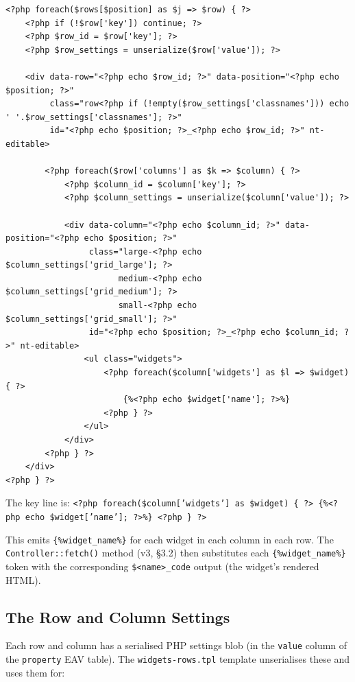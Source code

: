 \documentclass[11pt,a4paper]{article}
\begin{document}
\begin{lstlisting}[caption={\texttt{shared/widgets-rows.tpl} --- the placeholder emitter.},label={lst:widgets-rows}]
<?php foreach($rows[$position] as $j => $row) { ?>
    <?php if (!$row['key']) continue; ?>
    <?php $row_id = $row['key']; ?>
    <?php $row_settings = unserialize($row['value']); ?>

    <div data-row="<?php echo $row_id; ?>" data-position="<?php echo $position; ?>"
         class="row<?php if (!empty($row_settings['classnames'])) echo ' '.$row_settings['classnames']; ?>"
         id="<?php echo $position; ?>_<?php echo $row_id; ?>" nt-editable>

        <?php foreach($row['columns'] as $k => $column) { ?>
            <?php $column_id = $column['key']; ?>
            <?php $column_settings = unserialize($column['value']); ?>

            <div data-column="<?php echo $column_id; ?>" data-position="<?php echo $position; ?>"
                 class="large-<?php echo $column_settings['grid_large']; ?>
                       medium-<?php echo $column_settings['grid_medium']; ?>
                       small-<?php echo $column_settings['grid_small']; ?>"
                 id="<?php echo $position; ?>_<?php echo $column_id; ?>" nt-editable>
                <ul class="widgets">
                    <?php foreach($column['widgets'] as $l => $widget) { ?>
                        {%<?php echo $widget['name']; ?>%}
                    <?php } ?>
                </ul>
            </div>
        <?php } ?>
    </div>
<?php } ?>
\end{lstlisting}

The key line is:
\texttt{<?php foreach(\$column['widgets'] as \$widget) \{ ?> \{\%<?php echo \$widget['name']; ?>\%\} <?php \} ?>}

This emits \texttt{\{\%widget\_name\%\}} for each widget in each column
in each row. The \texttt{Controller::fetch()} method (v3, \S3.2) then
substitutes each \texttt{\{\%widget\_name\%\}} token with the
corresponding \texttt{\$<name>\_code} output (the widget's rendered HTML).

\subsection{The Row and Column Settings}

Each row and column has a serialised PHP settings blob (in the
\texttt{value} column of the \texttt{property} EAV table). The
\texttt{widgets-rows.tpl} template unserialises these and uses them for:
\end{document}
